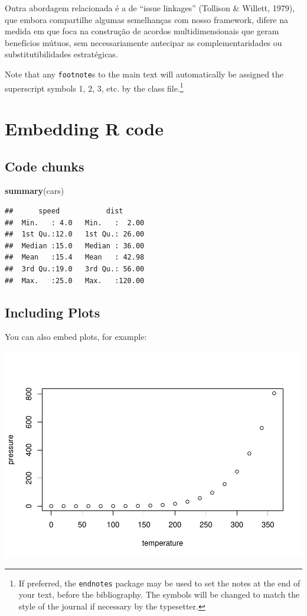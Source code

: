 \documentclass[]{interact}
\theoremstyle{plain}%
\theoremstyle{definition}
\theoremstyle{remark}
\newenvironment{Shaded}{\begin{snugshade}}{\end{snugshade}}
\newcommand{\FunctionTok}[1]{\textcolor[rgb]{0.13,0.29,0.53}{\textbf{#1}}}
\newcommand{\NormalTok}[1]{#1}
\begin{document}
Outra abordagem relacionada é a de ``issue linkages'' (Tollison \&
Willett, 1979), que embora compartilhe algumas semelhanças com nosso
framework, difere na medida em que foca na construção de acordos
multidimensionais que geram benefícios mútuos, sem necessariamente
antecipar as complementaridades ou substitutibilidades estratégicas.

Note that any \texttt{footnote}s to the main text will automatically be
assigned the superscript symbols 1, 2, 3, etc. by the class
file.\footnote{If preferred, the \texttt{endnotes} package may be used
  to set the notes at the end of your text, before the bibliography. The
  symbols will be changed to match the style of the journal if necessary
  by the typesetter.}

\hypertarget{embedding-r-code}{%
\section{Embedding R code}\label{embedding-r-code}}

\hypertarget{code-chunks}{%
\subsection{Code chunks}\label{code-chunks}}

\begin{Shaded}
\begin{Highlighting}[]
\FunctionTok{summary}\NormalTok{(cars)}
\end{Highlighting}
\end{Shaded}

\begin{verbatim}
##      speed           dist       
##  Min.   : 4.0   Min.   :  2.00  
##  1st Qu.:12.0   1st Qu.: 26.00  
##  Median :15.0   Median : 36.00  
##  Mean   :15.4   Mean   : 42.98  
##  3rd Qu.:19.0   3rd Qu.: 56.00  
##  Max.   :25.0   Max.   :120.00
\end{verbatim}

\hypertarget{including-plots}{%
\subsection{Including Plots}\label{including-plots}}

You can also embed plots, for example:

\includegraphics[width=0.8\linewidth]{research_project_files/figure-latex/pressure-1}
\end{document}
